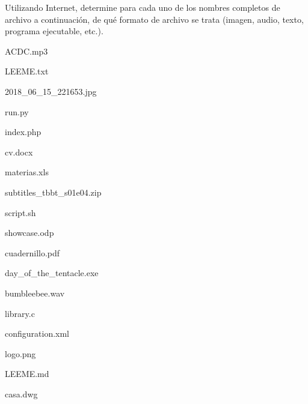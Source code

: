 \begin{exercise}
Utilizando Internet, determine para cada uno de los nombres completos de archivo
a continuación, de qué formato de archivo se trata (imagen, audio, texto,
programa ejecutable, etc.).

\begin{enumerate}[a)]
    \begin{minipage}{0.45\textwidth}
        \item ACDC.mp3
        \item LEEME.txt
        \item 2018\_06\_15\_221653.jpg
        \item run.py
        \item index.php
        \item cv.docx
        \item materias.xls
        \item subtitles\_tbbt\_s01e04.zip
        \item script.sh
    \end{minipage}
    \begin{minipage}{0.45\textwidth}
        \item showcase.odp
        \item cuadernillo.pdf
        \item day\_of\_the\_tentacle.exe
        \item bumbleebee.wav
        \item library.c
        \item configuration.xml
        \item logo.png
        \item LEEME.md
        \item casa.dwg
    \end{minipage}
\end{enumerate}

\end{exercise}

